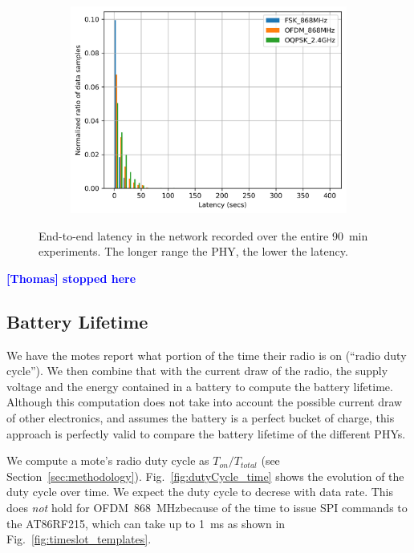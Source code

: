\documentclass[sensors,article,submit,moreauthors,pdftex]{Definitions/mdpi}
\newcommand{\ofdm}          {OFDM~868~MHz}
\newcommand{\thomas}[1]     {\textbf{\textcolor{blue}{[Thomas] #1}}}
\begin{document}
\begin{figure}
\begin{subfigure}{0.49\columnwidth}
    	\includegraphics[width=1.00\columnwidth]{latency_pdf}
    	\label{fig:latency_pdf}
	\end{subfigure}
	\caption{
	    End-to-end latency in the network recorded over the entire 90~min experiments.
	    The longer range the PHY, the lower the latency.
	}
	\label{fig:latency_all}
\end{figure}

\thomas{stopped here}

\subsection{Battery Lifetime}
\label{sec:res_lifetime}

We have the motes report what portion of the time their radio is on (``radio duty cycle'').
We then combine that with the current draw of the radio, the supply voltage and the energy contained in a battery to compute the battery lifetime.
Although this computation does not take into account the possible current draw of other electronics, and assumes the battery is a perfect bucket of charge, this approach is perfectly valid to compare the battery lifetime of the different PHYs.


We compute a mote's radio duty cycle as $T_{on}/T_{total}$ (see Section~\ref{sec:methodology}).
Fig.~\ref{fig:dutyCycle_time} shows the evolution of the duty cycle over time.
We expect the duty cycle to decrese with data rate.
This does \textit{not} hold for \ofdm because of the time to issue SPI commands to the AT86RF215, which can take up to 1~ms as shown in Fig.~\ref{fig:timeslot_templates}.
\end{document}
